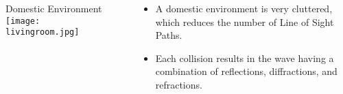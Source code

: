 \documentclass[final]{beamer}
\theoremstyle{plain}
\theoremstyle{definition}
\theoremstyle{remark}
\newlength{\twocolwid}
\begin{document}
\begin{frame}[t]
\begin{columns}[t]
\begin{column}{\twocolwid}
\begin{columns}
\begin{column}{0.45\linewidth}

\begin{block}{Domestic Environment}
\vspace{-1cm}
\texttt{[image: livingroom.jpg]} 
\end{block}

\end{column}
\begin{column}{0.01\linewidth}

\end{column}
\begin{column}{0.45\linewidth}
\vspace{-1.25cm}
\begin{mdframed}[backgroundcolor=white, userdefinedwidth=0.999999\linewidth]
\vspace{0.5cm}
\begin{itemize}
\item A domestic environment is very cluttered, which reduces the number of Line of Sight Paths.
\item Each collision results in the wave having a combination of reflections, diffractions, and refractions. 
\end{itemize}
\vspace{0.5cm}
\end{mdframed}

\end{column}
\end{columns}




\end{column}
\end{columns}
\end{frame}
\end{document}
